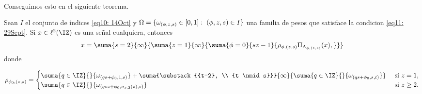 Conseguimos esto
en el siguiente teorema.


\begin{teo}
Sean $I$ el conjunto de índices \eqref{eq10: 14Oct}
y $\Omega=\{\omega_{(\phi, z,s)} \in [0,1]:
\hspace{0.1cm} (\phi, z,s) \in I \}$ una familia 
de pesos que satisface la condicion
\eqref{eq11: 29Sept}. Si $x \in \ell^{2}(\IZ)$
es una señal cualquiera, entonces
\begin{equation} \label{eq: descomposicion x con pesos rho}
x=
\suma{s=2}{\infty}{
\suma{z=1}{\infty}{
\suma{\phi=0}{sz-1}{
\rho_{\phi, (z,s)} \Pi_{\Lambda_{\phi, (z,s)}}(x),
}
}
}
\end{equation}
\noindent
donde

\begin{align}  \label{expresiones para los coeficientes rho}
\rho_{\phi_{0}, (z,s)}= \begin{cases}
\suma{q \in \IZ}{}{
\omega_{(qs+\phi_{0},1,s)}}
+ \suma{\substack{{t=2}, \\  {t \nmid s}}}{\infty}{
\suma{q \in \IZ}{}{\omega_{(qs+\phi_{0}, s, t)}}
} & \text{ si } z=1, \\
\suma{q \in \IZ}{}{
\omega_{(qsz+\phi_{0},\sigma_{s,2}(z),s)}} & \text{ si } z\geq 2.
\end{cases}
\end{align}
\end{teo}


